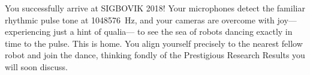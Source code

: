You successfully arrive at SIGBOVIK 2018!
Your microphones detect the familiar rhythmic pulse tone at 1048576~Hz,
and your cameras are overcome with joy---experiencing just a hint of qualia---%
to see the sea of robots dancing exactly in time to the pulse.
This is home.
You align yourself precisely to the nearest fellow robot and join the dance,
thinking fondly of the Prestigious Research Results you will soon discuss.

\success

\renewcommand{\refname}{The SIGBOVIK 2018 Program Committee Thanks}




